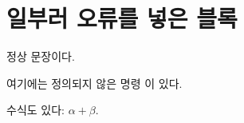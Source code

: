 \section{일부러 오류를 넣은 블록}

정상 문장이다.

여기에는 정의되지 않은 명령 \undefinedmacro 이 있다.

수식도 있다: $\alpha + \beta$.
